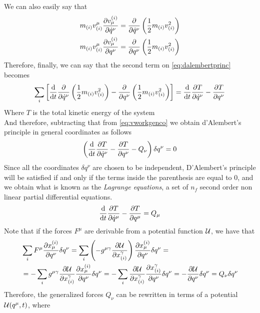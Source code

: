 \documentclass[../admech.tex]{subfiles}
\begin{document}
We can also easily say that
\begin{equation*}
	\begin{aligned}
		m_{(i)}v^\mu_{(i)}\pdv{v_\mu^{(i)}}{\dot{q}^\nu}&=\pdv{\dot{q}^\nu}\left( \frac{1}{2}m_{(i)}v^2_{(i)} \right)\\
		m_{(i)}v^\mu_{(i)}\pdv{v_\mu^{(i)}}{q^\nu}&=\pdv{q^\nu}\left( \frac{1}{2}m_{(i)}v^2_{(i)} \right)
	\end{aligned}
\end{equation*}
Therefore, finally, we can say that the second term on \eqref{eq:dalembertprinc} becomes
\begin{equation}
	\sum_i\left[ \dv{t}\pdv{\dot{q}^\nu}\left( \frac{1}{2}m_{(i)}v^2_{(i)} \right)-\pdv{q^\nu}\left( \frac{1}{2}m_{(i)}v^2_{(i)} \right) \right]=\dv{t}\pdv{T}{\dot{q}^\nu}-\pdv{T}{q^\nu}
\end{equation}
Where $T$ is the total kinetic energy of the system\\
And therefore, subtracting that from \eqref{eq:vworkgenco} we obtain d'Alembert's principle in general coordinates as follows
\begin{equation}
	\left( \dv{t}\pdv{T}{\dot{q}^\nu}-\pdv{T}{q^\nu}-Q_\nu \right)\delta q^\nu=0
	\label{eq:dalembgen}
\end{equation}
Since all the coordinates $\delta q^\nu$ are chosen to be independent, D'Alembert's principle will be satisfied if and only if the terms inside the parenthesis are equal to $0$, and we obtain what is known as the \emph{\emph{Lagrange equations}}, a set of $n_f$ second order non linear partial differential equations.
\begin{equation}
	\dv{t}\pdv{T}{\dot{q}^\mu}-\pdv{T}{q^\mu}=Q_\mu
	\label{eq:lagrangeeq1}
\end{equation}
Note that if the forces $F^\mu$ are derivable from a potential function $\mathcal{U}$, we have that
\begin{equation}
	\begin{aligned}
		&\sum_iF^\mu\pdv{x_\mu^{(i)}}{q^\nu}\delta q^\nu=\sum_i\left( -g^{\mu\gamma}\pdv{\mathcal{U}}{x^\gamma_{(i)}} \right)\pdv{x_\mu^{(i)}}{q^\nu}\delta q^\nu=\\
		&=-\sum_ig^{\mu\gamma}\pdv{\mathcal{U}}{x^\gamma_{(i)}}\pdv{x_\mu^{(i)}}{q^\nu}\delta q^\nu=-\sum_i\pdv{\mathcal{U}}{x^\gamma_{(i)}}\pdv{x^\gamma_{(i)}}{q^\nu}\delta q^\nu=-\pdv{\mathcal{U}}{q^\nu}\delta q^\nu=Q_\nu\delta q^\nu
	\end{aligned}
	\label{eq:genpot}
\end{equation}
Therefore, the generalized forces $Q_\nu$ can be rewritten in terms of a potential $\mathcal{U}(q^\mu,t)$, where
\end{document}
